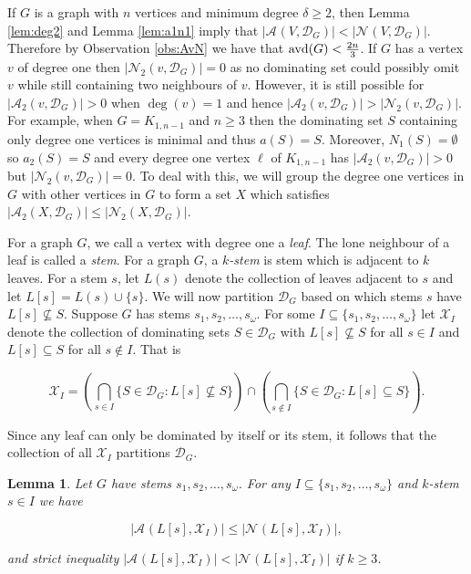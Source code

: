 \documentclass[11pt]{article}
\newtheorem{lemma}[definition]{Lemma}
\newcommand{\avd}{\text{\rm{avd}}}
\newcommand{\A}[3][\mathcal{D}_G]{\mathcal{A}_{#3}(#2, #1)}
\newcommand{\N}[3][\mathcal{D}_G]{\mathcal{N}_{#3}(#2, #1)}
\begin{document}
If $G$ is a graph with $n$ vertices and minimum degree $\delta \geq 2$, then Lemma \ref{lem:deg2} and Lemma \ref{lem:a1n1} imply that $|\A{V}{}| < |\N{V}{}|$. Therefore by Observation \ref{obs:AvN} we have that $\avd(G) < \frac{2n}{3}$. If $G$ has a vertex $v$ of degree one then $|\N{v}{2}|=0$ as no dominating set could possibly omit $v$ while still containing two neighbours of $v$. However, it is still possible for $|\A{v}{2}| > 0$ when $\deg(v)=1$ and hence $|\A{v}{2}| > |\N{v}{2}|$. For example, when $G = K_{1,n-1}$ and $n\geq 3$ then the dominating set $S$ containing only degree one vertices is minimal and thus $a(S)=S$. Moreover, $N_1(S) = \emptyset$ so $a_2(S)=S$ and every degree one vertex $\ell$ of $K_{1,n-1}$ has $|\A{v}{2}| > 0$ but $|\N{v}{2}|=0$. To deal with this, we will group the degree one vertices in $G$ with other vertices in $G$ to form a set $X$ which satisfies $|\A{X}{2}| \leq |\N{X}{2}|$.



For a graph $G$, we call a vertex with degree one a \emph{leaf}. The lone neighbour of a leaf is called a \emph{stem}. For a graph $G$, a \emph{$k$-stem} is stem which is adjacent to $k$ leaves. For a stem $s$, let $L(s)$ denote the collection of leaves adjacent to $s$ and let $L[s]=L(s) \cup \{s\}$. We will now partition $\mathcal{D}_G$ based on which stems $s$ have $L[s] \not\subseteq S$. Suppose $G$ has stems $s_1, s_2, \ldots , s_{\omega}$. For some $I \subseteq \{s_1, s_2, \ldots, s_{\omega}\}$ let $\mathcal{X}_{I}$ denote the collection of dominating sets $S \in \mathcal{D}_G$ with $L[s] \not\subseteq  S$ for all $s \in I$ and $L[s] \subseteq  S$ for all $s \notin I$. That is

$$\mathcal{X}_{I}= \left( \bigcap_{s \in I} \{S \in \mathcal{D}_G : L[s] \not\subseteq  S \} \right) \cap \left( \bigcap_{s \notin I} \{S \in \mathcal{D}_G : L[s] \subseteq  S\} \right).$$

\noindent Since any leaf can only be dominated by itself or its stem, it follows that the collection of all $\mathcal{X}_{I}$ partitions $\mathcal{D}_G$.



\begin{lemma}
\label{lem:kstem}
Let $G$ have stems $s_1, s_2, \ldots , s_{\omega}$. For any $I \subseteq \{s_1, s_2, \ldots, s_{\omega}\}$ and \emph{$k$-stem} $s \in I$ we have

$$|\A[\mathcal{X}_{I}]{L[s]}{}|\leq |\N[\mathcal{X}_{I}]{L[s]}{}|, $$

\noindent and strict inequality $|\A[\mathcal{X}_{I}]{L[s]}{}| < |\N[\mathcal{X}_{I}]{L[s]}{}|$ if $k \geq 3$.
\end{lemma}
\end{document}
